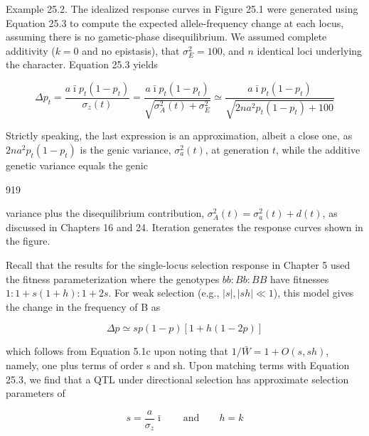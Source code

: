 \documentclass{article}
\begin{document}
Example 25.2. The idealized response curves in Figure 25.1 were generated using Equation 25.3 to compute the expected allele-frequency change at each locus, assuming there is no gametic-phase disequilibrium. We assumed complete additivity ($k = 0$ and no epistasis), that $\sigma_E^2 = 100$, and $n$ identical loci underlying the character. Equation 25.3 yields

\begin{equation}
\Delta p_{t}=\frac{a\bar{\imath}p_{t}(1-p_{t})}{\sigma_{z}(t)}=\frac{a\bar{\imath}p_{t}(1-p_{t})}{\sqrt{\sigma_{A}^{2}(t)+\sigma_{E}^{2}}}\simeq\frac{a\bar{\imath}p_{t}(1-p_{t})}{\sqrt{2na^{2}p_{t}(1-p_{t})+100}}
\end{equation}

Strictly speaking, the last expression is an approximation, albeit a close one, as  $ 2na^2p_t(1-p_t) $ is the genic variance,  $ \sigma_a^2(t) $, at generation  $ t $, while the additive genetic variance equals the genic

919

variance plus the disequilibrium contribution,  $ \sigma_A^2(t) = \sigma_a^2(t) + d(t) $, as discussed in Chapters 16 and 24. Iteration generates the response curves shown in the figure.

Recall that the results for the single-locus selection response in Chapter 5 used the fitness parameterization where the genotypes  $ bb: Bb: BB $ have fitnesses  $ 1:1 + s(1 + h):1 + 2s $. For weak selection (e.g.,  $ |s|, |sh| \ll 1 $), this model gives the change in the frequency of B as

\begin{equation}
\Delta p\simeq s p\left(1-p\right)\left[1+h\left(1-2p\right)\right]
\end{equation}

which follows from Equation 5.1c upon noting that  $ 1/\bar{W}=1+O(s,sh) $, namely, one plus terms of order s and sh. Upon matching terms with Equation 25.3, we find that a QTL under directional selection has approximate selection parameters of

\begin{equation}
s=\frac{a}{\sigma_{z}}\bar{\imath}\qquad\mathrm{a n d}\qquad h=k
\tag{25.4}
\label{eq:25_4}
\end{equation}
\end{document}
